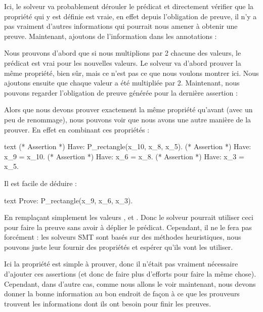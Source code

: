 





Ici, le solveur va probablement dérouler le prédicat et directement vérifier
que la propriété qui y est définie est vraie, en effet depuis l'obligation de
preuve, il n'y a pas vraiment d'autres informations qui pourrait nous
amener à obtenir une preuve. Maintenant, ajoutons de l'information dans les
annotations :






Nous prouvons d'abord que si nous multiplions par 2 chacune des valeurs, le
prédicat est vrai pour les nouvelles valeurs. Le solveur va d'abord prouver
la même propriété, bien sûr, mais ce n'est pas ce que nous voulons montrer ici.
Nous ajoutons ensuite que chaque valeur a été multipliée par 2. Maintenant, nous
pouvons regarder l'obligation de preuve générée pour la dernière assertion :





Alors que nous devons prouver exactement la même propriété qu'avant (avec un peu
de renommage), nous pouvons voir que nous avons une autre manière de la prouver.
En effet en combinant ces propriétés :


\begin{CodeBlock}{text}
(* Assertion *)
Have: P_rectangle(x_10, x_8, x_5).
(* Assertion *)
Have: x_9 = x_10.
(* Assertion *)
Have: x_6 = x_8.
(* Assertion *)
Have: x_3 = x_5.
\end{CodeBlock}


Il est facile de déduire :


\begin{CodeBlock}{text}
Prove: P_rectangle(x_9, x_6, x_3).
\end{CodeBlock}


En remplaçant simplement les valeurs ,  et
. Donc le solveur pourrait utiliser ceci pour faire la preuve
sans avoir à déplier le prédicat. Cependant, il ne le fera pas forcément : les
solveurs SMT sont basés sur des méthodes heuristiques, nous pouvons juste leur
fournir des propriétés et espérer qu'ils vont les utiliser.


Ici la propriété est simple à prouver, donc il n'était pas vraiment nécessaire
d'ajouter ces assertions (et donc de faire plus d'efforts pour faire la même
chose). Cependant, dans d'autre cas, comme nous allons le voir maintenant, nous
devons donner la bonne information au bon endroit de façon à ce que les prouveurs
trouvent les informations dont ils ont besoin pour finir les preuves.


